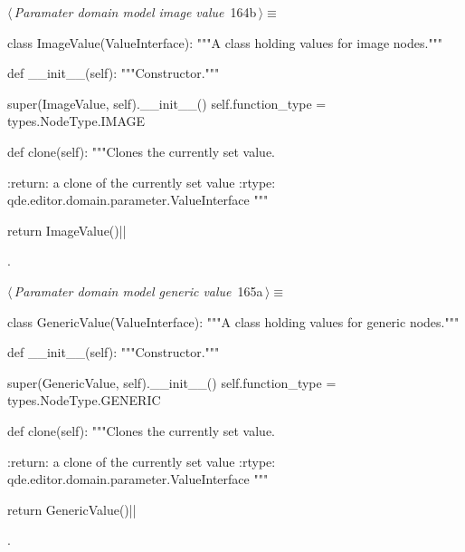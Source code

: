 \documentclass[%
    a4paper,    %
    justified,  %
    nobib,      %
    openany     %
]{tufte-book}
\begin{document}
\begin{flushleft} \small
\begin{minipage}{\linewidth}\label{scrap182}\raggedright\small
{} $\langle\,${\itshape Paramater domain model image value}\nobreak\ {\footnotesize {164b}}$\,\rangle\equiv$
\vspace{-1ex}
\begin{pythoncode}
class ImageValue(ValueInterface):
    """A class holding values for image nodes."""

    def __init__(self):
        """Constructor."""

        super(ImageValue, self).__init__()
        self.function_type = types.NodeType.IMAGE

    def clone(self):
        """Clones the currently set value.

        :return: a clone of the currently set value
        :rtype:  qde.editor.domain.parameter.ValueInterface
        """

        return ImageValue()|\NWsep|
\end{pythoncode}
\vspace{1.5ex}
\footnotesize
\begin{list}{}{\setlength{\itemsep}{-\parsep}\setlength{\itemindent}{-\leftmargin}}
\item {\NWtxtMacroNoRef}.

\item{}
\end{list}
\end{minipage}\vspace{4ex}
\end{flushleft}
\begin{flushleft} \small
\begin{minipage}{\linewidth}\label{scrap183}\raggedright\small
{} $\langle\,${\itshape Paramater domain model generic value}\nobreak\ {\footnotesize {165a}}$\,\rangle\equiv$
\vspace{-1ex}
\begin{pythoncode}
class GenericValue(ValueInterface):
    """A class holding values for generic nodes."""

    def __init__(self):
        """Constructor."""

        super(GenericValue, self).__init__()
        self.function_type = types.NodeType.GENERIC

    def clone(self):
        """Clones the currently set value.

        :return: a clone of the currently set value
        :rtype:  qde.editor.domain.parameter.ValueInterface
        """

        return GenericValue()|\NWsep|
\end{pythoncode}
\vspace{1.5ex}
\footnotesize
\begin{list}{}{\setlength{\itemsep}{-\parsep}\setlength{\itemindent}{-\leftmargin}}
\item {\NWtxtMacroNoRef}.

\item{}
\end{list}
\end{minipage}\vspace{4ex}
\end{flushleft}
\end{document}
